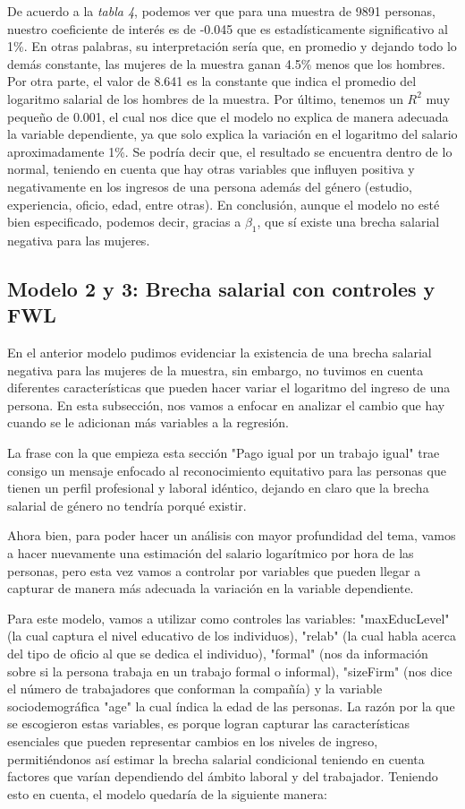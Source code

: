 \documentclass[10pt]{article}
\begin{document}
De acuerdo a la \textit{tabla 4}, podemos ver que para una muestra de 9891 personas, nuestro coeficiente de interés es de -0.045 que es estadísticamente significativo al 1\%. En otras palabras, su interpretación sería que, en promedio y dejando todo lo demás constante, las mujeres de la muestra ganan 4.5\% menos que los hombres. Por otra parte, el valor de 8.641 es la constante que indica el promedio del logaritmo salarial de los hombres de la muestra. Por último, tenemos un \( R^2 \) muy pequeño de 0.001, el cual nos dice que el modelo no explica de manera adecuada la variable dependiente, ya que solo explica la variación en el logaritmo del salario aproximadamente 1\%. Se podría decir que, el  resultado se encuentra dentro de lo normal, teniendo en cuenta que hay otras variables que influyen positiva y negativamente en los ingresos de una persona además del género (estudio, experiencia, oficio, edad, entre otras). En conclusión, aunque el modelo no esté bien especificado, podemos decir, gracias a $\beta_1$, que sí existe una brecha salarial negativa para las mujeres. 

\subsection{Modelo 2 y 3: Brecha salarial con controles y FWL}
En el anterior modelo pudimos evidenciar la existencia de una brecha salarial negativa para las mujeres de la muestra, sin embargo, no tuvimos en cuenta diferentes características que pueden hacer variar el logaritmo del ingreso de una persona. En esta subsección, nos vamos a enfocar en analizar el cambio que hay cuando se le adicionan más variables a la regresión. 

La frase con la que empieza esta sección "Pago igual por un trabajo igual" trae consigo un mensaje enfocado al reconocimiento equitativo para las personas que tienen un perfil profesional y laboral idéntico, dejando en claro que la brecha salarial de género no tendría porqué existir. 

Ahora bien, para poder hacer un análisis con mayor profundidad del tema, vamos a hacer nuevamente una estimación del salario logarítmico por hora de las personas, pero esta vez vamos a controlar por variables que pueden llegar a capturar de manera más adecuada la variación en la variable dependiente. 

Para este modelo, vamos a utilizar como controles las variables: "maxEducLevel" (la cual captura el nivel educativo de los individuos), "relab" (la cual habla acerca del tipo de oficio al que se dedica el individuo), "formal" (nos da información sobre si la persona trabaja en un trabajo formal o informal), "sizeFirm" (nos dice el número de trabajadores que conforman la compañía) y la variable sociodemográfica "age" la cual índica la edad de las personas. La razón por la que se escogieron estas variables, es porque logran capturar las características esenciales que pueden representar cambios en los niveles de ingreso, permitiéndonos así estimar la brecha salarial condicional teniendo en cuenta factores que varían dependiendo del ámbito laboral y del trabajador. 
Teniendo esto en cuenta, el modelo quedaría de la siguiente manera: 
\end{document}
